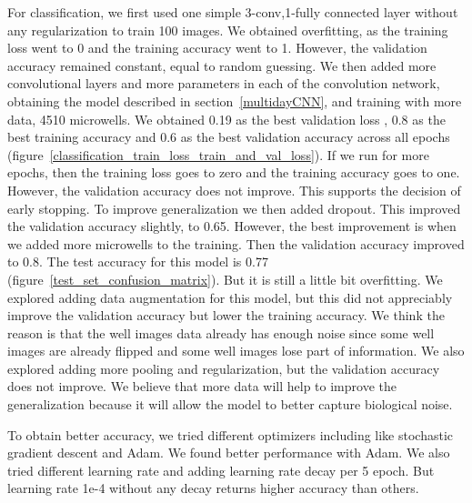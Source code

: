 \documentclass[10pt,twocolumn,letterpaper]{article}
\begin{document}
For classification,  we first used one simple 3-conv,1-fully connected layer without any regularization to train 100 images.  We obtained overfitting, as the training loss went to 0 and the training accuracy  went to 1. However, the validation accuracy remained constant, equal to random guessing.  We then added more convolutional layers and more parameters in each of the convolution network, obtaining the model described in section~\ref{multidayCNN},  and training with more data, 4510 microwells.  We obtained 0.19 as the best validation loss , 0.8 as the best training accuracy and 0.6 as the best validation accuracy across all epochs (figure~\ref{classification_train_loss_train_and_val_loss}).  If we run for more epochs, then the training loss goes to zero and the training accuracy goes to one.  However, the validation accuracy does not improve.  This supports the decision of early stopping.  To improve generalization we then added dropout.  This improved the validation accuracy slightly, to 0.65.
However, the best improvement is when we added more microwells to the training.  Then the validation accuracy improved to 0.8.  The test accuracy for this model is 0.77 (figure~\ref{test_set_confusion_matrix}). But it is still a little bit overfitting.
We explored adding data augmentation for this model, but this did not appreciably improve the validation accuracy but lower the training accuracy. We think the reason is that the well images data already has enough noise since some well images are already flipped and some well images lose part of information. We also explored adding more pooling and regularization, but the validation accuracy does not improve.  We believe that more data will help to improve the generalization because it will allow the model to better capture biological noise.



To obtain better accuracy, we tried different optimizers including like stochastic gradient descent and Adam. We found better performance with Adam. We also tried different learning rate and adding learning rate decay per 5 epoch. But learning rate 1e-4 without any decay returns higher accuracy than others. 
  




\end{document}
